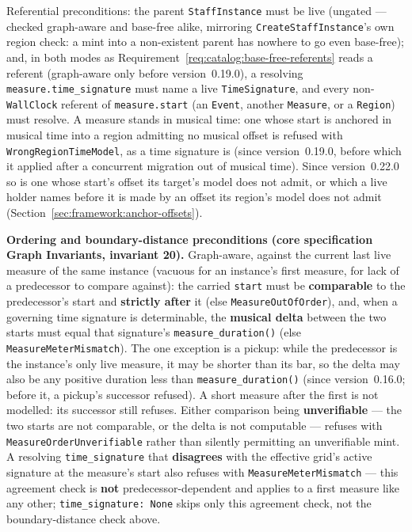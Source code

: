 \documentclass[11pt,letterpaper]{report}
\newcommand{\sectionsc}[1]{{\addfontfeatures{Letters=SmallCaps}#1}}
\begin{document}
Referential preconditions: the parent \texttt{StaffInstance} must be live
(ungated --- checked graph-aware and base-free alike, mirroring
\texttt{CreateStaffInstance}'s own region check: a mint into a non-existent
parent has nowhere to go even base-free); and, in both modes as
Requirement~\ref{req:catalog:base-free-referents} reads a referent (graph-aware
only before version~0.19.0), a resolving
\texttt{measure.time\_signature} must name a live \texttt{TimeSignature}, and
every non-\texttt{WallClock} referent of \texttt{measure.start} (an
\texttt{Event}, another \texttt{Measure}, or a \texttt{Region}) must resolve.
A measure stands in musical time: one whose start is anchored in musical time
into a region admitting no musical offset is refused with
\texttt{WrongRegionTimeModel}, as a time signature is (since version~0.19.0,
before which it applied after a concurrent migration out of musical time).
Since version~0.22.0 so is one whose start's offset its target's model does
not admit, or which a live holder names before it is made by an offset its
region's model does not admit (Section~\ref{sec:framework:anchor-offsets}).

\textbf{Ordering and boundary-distance preconditions (core specification
\sectionsc{Graph Invariants}, invariant 20).} Graph-aware, against the current
last live measure of the same instance (vacuous for an instance's first
measure, for lack of a predecessor to compare against): the carried
\texttt{start} must be \textbf{comparable} to the predecessor's start and
\textbf{strictly after} it (else \texttt{MeasureOutOfOrder}), and, when a
governing time signature is determinable, the \textbf{musical delta} between
the two starts must equal that signature's \texttt{measure\_duration()} (else
\texttt{MeasureMeterMismatch}). The one exception is a pickup: while the
predecessor is the instance's only live measure, it may be shorter than its
bar, so the delta may also be any positive duration less than
\texttt{measure\_duration()} (since version~0.16.0; before it, a pickup's
successor refused). A short measure after the first is not modelled: its
successor still refuses. Either comparison being \textbf{unverifiable}
--- the two starts are not comparable, or the delta is not computable ---
refuses with \texttt{MeasureOrderUnverifiable} rather than silently permitting
an unverifiable mint. A resolving \texttt{time\_signature} that
\textbf{disagrees} with the effective grid's active signature at the
measure's start also refuses with \texttt{MeasureMeterMismatch} --- this
agreement check is \textbf{not} predecessor-dependent and applies to a first
measure like any other; \texttt{time\_signature: None} skips only this
agreement check, not the boundary-distance check above.
\end{document}
